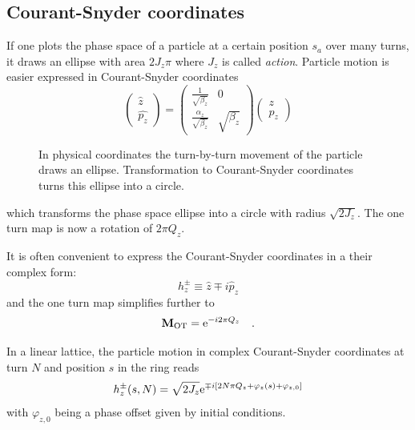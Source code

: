\subsection{Courant-Snyder coordinates}
If one plots the phase space of a particle at a certain position $s_a$ over many turns, it draws an
ellipse with area $2J_z\pi$ where $J_z$ is called \emph{action}.
Particle motion is easier expressed in Courant-Snyder coordinates
%
\begin{equation}
    \begin{pmatrix}
        \hat{z}\\
        \hat{p_z}
    \end{pmatrix}
    =
    \begin{pmatrix}
        \frac{1}{\sqrt{\beta_z}} & 0\\
        \frac{\alpha_z}{\sqrt{\beta_z}} & \sqrt{\beta_z}
    \end{pmatrix}
    \begin{pmatrix}
        z\\
        p_z
    \end{pmatrix}
    \label{eq_cs_matrix}
\end{equation}
%
\begin{figure}[h]
    \centering
    
    \hspace{1cm}
    
    \caption{In physical coordinates the turn-by-turn movement of the particle draws an ellipse.
        Transformation to Courant-Snyder
        coordinates turns this ellipse into a circle.}
    \label{fig_phase_space_ellipse}
\end{figure}
%
which transforms the phase space ellipse into a circle with radius $\sqrt{2J_z}$.
The one turn map is now a rotation of $2\pi Q_z$. 

It is often convenient to express the Courant-Snyder coordinates in a their complex form:
%
\begin{equation}
    h^\pm_z \equiv \hat{z} \mp i \hat{p}_z
    \label{eq_courantsnyder}
\end{equation}
%
and the one turn map simplifies further to
%
\begin{equation}
    \mathbf{M}_\text{OT} = \text{e}^{-i2\pi Q_z}
    \quad .
\end{equation}

In a linear lattice, the particle motion in complex Courant-Snyder coordinates at turn $N$ and position
$s$ in the ring reads
%
\begin{equation}
    h_z^\pm(s,N) = \sqrt{2J_z} \text{e}^{\mp i \left[2N\pi Q_z + \varphi_z(s) + \varphi_{z,0}\right]}
\end{equation}
%
with $\varphi_{z,0}$ being a phase offset given by initial conditions.

